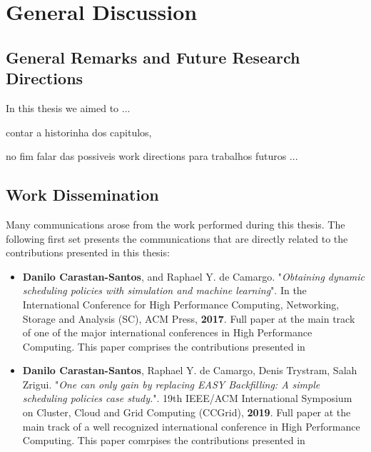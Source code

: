 \chapter{General Discussion}
\label{chap-conclusion}

\section{General Remarks and Future Research Directions}

In this thesis we aimed to ... 

contar a historinha dos capitulos,

no fim falar das possiveis work directions para trabalhos futuros ...


\section{Work Dissemination}

Many communications arose from the work performed during this thesis. The following first set presents the communications that are directly related to the contributions presented in this thesis:

\begin{itemize}
    \item \textbf{Danilo Carastan-Santos}, and Raphael Y. de Camargo. "\textit{Obtaining dynamic scheduling policies with simulation and machine learning}". In the International Conference for High Performance Computing, Networking, Storage and Analysis (SC), ACM Press, \textbf{2017}. Full paper at the main track of one of the major international conferences in High Performance Computing. This paper comprises the contributions presented in%
    
    \item \textbf{Danilo Carastan-Santos}, Raphael Y. de Camargo, Denis Trystram, Salah Zrigui. "\textit{One can only gain by replacing EASY Backfilling: A simple scheduling policies case study.}". 19th IEEE/ACM International Symposium on Cluster, Cloud and Grid Computing (CCGrid), \textbf{2019}. Full paper at the main track of a well recognized international conference in High Performance Computing. This paper comrpises the contributions presented in%
\end{itemize}

